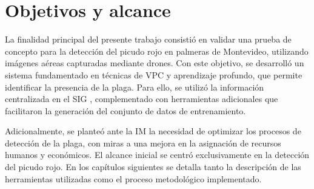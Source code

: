
\section{Objetivos y alcance}
\label{sec:objetivos}

La finalidad principal del presente trabajo consistió en validar una prueba de concepto para la detección del picudo rojo en palmeras de Montevideo, utilizando imágenes aéreas capturadas mediante drones. Con este objetivo, se desarrolló un sistema fundamentado en técnicas de VPC y aprendizaje profundo, que permite identificar la presencia de la plaga. Para ello, se utilizó la información centralizada en el SIG \citep{intendencia_de_montevideo_sistema_nodate}, complementado con herramientas adicionales que facilitaron la generación del conjunto de datos de entrenamiento.

Adicionalmente, se planteó ante la IM la necesidad de optimizar los procesos de detección de la plaga, con miras a una mejora en la asignación de recursos humanos y económicos. El alcance inicial se centró exclusivamente en la detección del picudo rojo. En los capítulos siguientes se detalla tanto la descripción de las herramientas utilizadas como el proceso metodológico implementado.